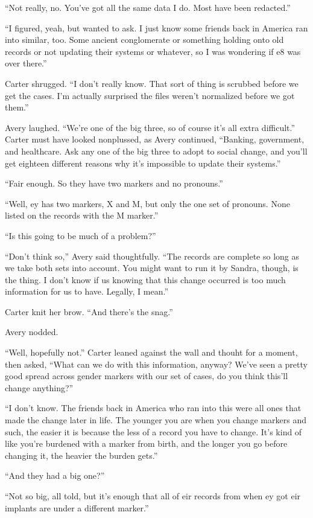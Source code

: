 ``Not really, no. You've got all the same data I do. Most have been redacted.''

``I figured, yeah, but wanted to ask. I just know some friends back in America ran into similar, too. Some ancient conglomerate or something holding onto old records or not updating their systems or whatever, so I was wondering if e8 was over there.''

Carter shrugged. ``I don't really know. That sort of thing is scrubbed before we get the cases. I'm actually surprised the files weren't normalized before we got them.''

Avery laughed. ``We're one of the big three, so of course it's all extra difficult.'' Carter must have looked nonplussed, as Avery continued, ``Banking, government, and healthcare. Ask any one of the big three to adopt to social change, and you'll get eighteen different reasons why it's impossible to update their systems.''

``Fair enough. So they have two markers and no pronouns.''

``Well, ey has two markers, X and M, but only the one set of pronouns. None listed on the records with the M marker.''

``Is this going to be much of a problem?''

``Don't think so,'' Avery said thoughtfully. ``The records are complete so long as we take both sets into account. You might want to run it by Sandra, though, is the thing. I don't know if us knowing that this change occurred is too much information for us to have. Legally, I mean.''

Carter knit her brow. ``And there's the snag.''

Avery nodded.

``Well, hopefully not.'' Carter leaned against the wall and thouht for a moment, then asked, ``What can we do with this information, anyway? We've seen a pretty good spread across gender markers with our set of cases, do you think this'll change anything?''

``I don't know. The friends back in America who ran into this were all ones that made the change later in life. The younger you are when you change markers and such, the easier it is because the less of a record you have to change. It's kind of like you're burdened with a marker from birth, and the longer you go before changing it, the heavier the burden gets.''

``And they had a big one?''

``Not so big, all told, but it's enough that all of eir records from when ey got eir implants are under a different marker.''

